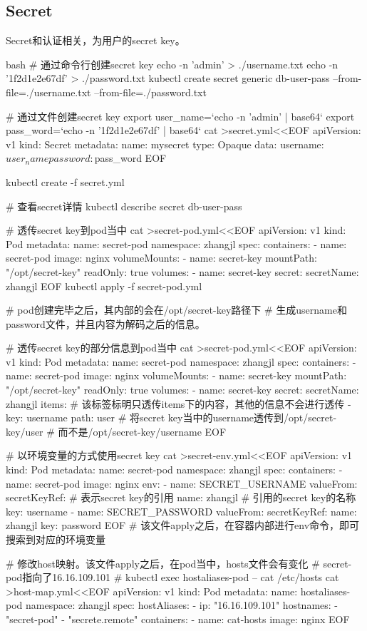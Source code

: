 \subsection{Secret}
Secret和认证相关，为用户的secret key。
\begin{code-block}{bash}
# 通过命令行创建secret key
echo -n 'admin' > ./username.txt
echo -n '1f2d1e2e67df' > ./password.txt
kubectl create secret generic db-user-pass --from-file=./username.txt --from-file=./password.txt

# 通过文件创建secret key
export user_name=`echo -n 'admin' | base64`
export pass_word=`echo -n '1f2d1e2e67df' | base64`
cat >secret.yml<<EOF
apiVersion: v1
kind: Secret
metadata:
  name: mysecret
type: Opaque
data:
  username: $user_name
  password: $pass_word
EOF

kubectl create -f secret.yml

# 查看secret详情
kubectl describe secret db-user-pass

# 透传secret key到pod当中
cat >secret-pod.yml<<EOF
apiVersion: v1
kind: Pod
metadata:
  name: secret-pod
  namespace: zhangjl
spec:
  containers:
  - name: secret-pod
    image: nginx
    volumeMounts:
    - name: secret-key
      mountPath: "/opt/secret-key"
      readOnly: true
  volumes:
  - name: secret-key
    secret:
      secretName: zhangjl
EOF
kubectl apply -f secret-pod.yml

# pod创建完毕之后，其内部的会在/opt/secret-key路径下
# 生成username和password文件，并且内容为解码之后的信息。

# 透传secret key的部分信息到pod当中
cat >secret-pod.yml<<EOF
apiVersion: v1
kind: Pod
metadata:
  name: secret-pod
  namespace: zhangjl
spec:
  containers:
  - name: secret-pod
    image: nginx
    volumeMounts:
    - name: secret-key
      mountPath: "/opt/secret-key"
      readOnly: true
  volumes:
  - name: secret-key
    secret:
      secretName: zhangjl
      items:             # 该标签标明只透传items下的内容，其他的信息不会进行透传
      - key: username
        path: user       # 将secret key当中的username透传到/opt/secret-key/user
                         # 而不是/opt/secret-key/username
EOF

# 以环境变量的方式使用secret key
cat >secret-env.yml<<EOF
apiVersion: v1
kind: Pod
metadata:
  name: secret-pod
  namespace: zhangjl
spec:
  containers:
  - name: secret-pod
    image: nginx
    env:
      - name: SECRET_USERNAME
        valueFrom:
          secretKeyRef:      # 表示secret key的引用
            name: zhangjl    # 引用的secret key的名称
            key: username
      - name: SECRET_PASSWORD
        valueFrom:
          secretKeyRef:
            name: zhangjl
            key: password
EOF
# 该文件apply之后，在容器内部进行env命令，即可搜索到对应的环境变量

# 修改host映射。该文件apply之后，在pod当中，hosts文件会有变化
# secret-pod指向了16.16.109.101
# kubectl exec hostaliases-pod -- cat /etc/hosts
cat >host-map.yml<<EOF
apiVersion: v1
kind: Pod
metadata:
  name: hostaliases-pod
  namespace: zhangjl
spec:
  hostAliases:
  - ip: "16.16.109.101"
    hostnames:
    - "secret-pod"
    - "secrete.remote"
  containers:
  - name: cat-hosts
    image: nginx
EOF

\end{code-block}

